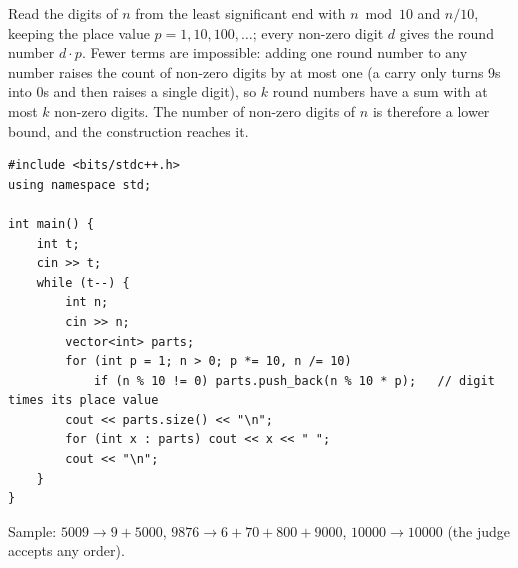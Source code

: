 \begin{solutionbox}
Read the digits of $n$ from the least significant end with $n \bmod 10$ and $n / 10$, keeping the place value $p = 1, 10, 100, \ldots$; every non-zero digit $d$ gives the round number $d \cdot p$. Fewer terms are impossible: adding one round number to any number raises the count of non-zero digits by at most one (a carry only turns 9s into 0s and then raises a single digit), so $k$ round numbers have a sum with at most $k$ non-zero digits. The number of non-zero digits of $n$ is therefore a lower bound, and the construction reaches it.
\begin{lstlisting}[style=cpp]
#include <bits/stdc++.h>
using namespace std;

int main() {
    int t;
    cin >> t;
    while (t--) {
        int n;
        cin >> n;
        vector<int> parts;
        for (int p = 1; n > 0; p *= 10, n /= 10)
            if (n % 10 != 0) parts.push_back(n % 10 * p);   // digit times its place value
        cout << parts.size() << "\n";
        for (int x : parts) cout << x << " ";
        cout << "\n";
    }
}
\end{lstlisting}
Sample: $5009 \to 9 + 5000$, $9876 \to 6 + 70 + 800 + 9000$, $10000 \to 10000$ (the judge accepts any order).
\end{solutionbox}

